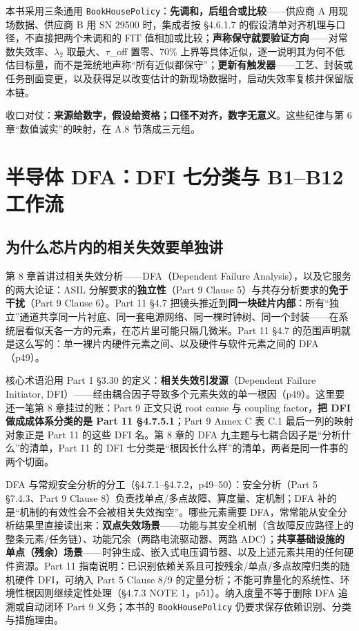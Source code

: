 本书采用三条通用 \nolinkurl{BookHousePolicy}：\textbf{先调和，后组合或比较}——供应商 A 用现场数据、供应商 B 用 SN 29500 时，集成者按 §4.6.1.7 的假设清单对齐机理与口径，不直接把两个未调和的 FIT 值相加或比较；\textbf{声称保守就要验证方向}——对常数失效率、\(\lambda\)\(_{2}\) 取最大、\(\tau\)\_off 置零、70\% 上界等具体近似，逐一说明其为何不低估目标量，而不是笼统地声称“所有近似都保守”；\textbf{更新有触发器}——工艺、封装或任务剖面变更，以及获得足以改变估计的新现场数据时，启动失效率复核并保留版本链。

收口对仗：\textbf{来源给数字，假设给资格；口径不对齐，数字无意义}。这些纪律与第 6 章“数值诚实”的映射，在 A.8 节落成三元组。

\section{半导体 DFA：DFI 七分类与 B1–B12 工作流}

\subsection{为什么芯片内的相关失效要单独讲}

第 8 章首讲过相关失效分析——DFA（Dependent Failure Analysis），以及它服务的两大论证：ASIL 分解要求的\textbf{独立性}（Part 9 Clause 5）与共存分析要求的\textbf{免于干扰}（Part 9 Clause 6）。Part 11 §4.7 把镜头推近到\textbf{同一块硅片内部}：所有“独立”通道共享同一片衬底、同一套电源网络、同一棵时钟树、同一个封装——在系统层看似天各一方的元素，在芯片里可能只隔几微米。Part 11 §4.7 的范围声明就是这么写的：单一裸片内硬件元素之间、以及硬件与软件元素之间的 DFA（p49）。

核心术语沿用 Part 1 §3.30 的定义：\textbf{相关失效引发源}（Dependent Failure Initiator, DFI）——经由耦合因子导致多个元素失效的单一根因（p49）。这里要还一笔第 8 章挂过的账：Part 9 正文只说 root cause 与 coupling factor，\textbf{把 DFI 做成成体系分类的是 Part 11 §4.7.5.1}；Part 9 Annex C 表 C.1 最后一列的映射对象正是 Part 11 的这些 DFI 名。第 8 章的 DFA 九主题与七耦合因子是“分析什么”的清单，Part 11 的 DFI 七分类是“根因长什么样”的清单，两者是同一件事的两个切面。

DFA 与常规安全分析的分工（§4.7.1–§4.7.2，p49–50）：安全分析（Part 5 §7.4.3、Part 9 Clause 8）负责找单点/多点故障、算度量、定机制；DFA 补的是“机制的有效性会不会被相关失效掏空”。哪些元素需要 DFA，常常能从安全分析结果里直接读出来：\textbf{双点失效场景}——功能与其安全机制（含故障反应路径上的整条元素/任务链）、功能冗余（两路电流驱动器、两路 ADC）；\textbf{共享基础设施的单点（残余）场景}——时钟生成、嵌入式电压调节器、以及上述元素共用的任何硬件资源。Part 11 指南说明：已识别依赖关系且可按残余/单点/多点故障归类的随机硬件 DFI，可纳入 Part 5 Clause 8/9 的定量分析；不能可靠量化的系统性、环境性根因则继续定性处理（§4.7.3 NOTE 1，p51）。纳入度量不等于删除 DFA 追溯或自动闭环 Part 9 义务；本书的 \nolinkurl{BookHousePolicy} 仍要求保存依赖识别、分类与措施理由。

